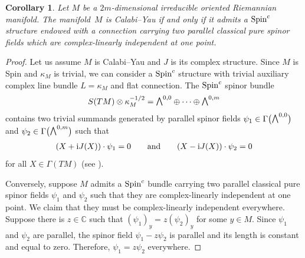 \documentclass[pdftex]{sigma}
\newcommand{\ext}{\raise1pt\hbox{\small$\bigwedge$}}
\numberwithin{equation}{section}
\newtheorem{Corollary}[Theorem]{Corollary}
\begin{document}
\begin{Corollary}Let $M$ be a $2m$-dimensional irreducible oriented Riemannian manifold. The mani\-fold~$M$ is Calabi--Yau if and only if it admits a ${\rm Spin}^c$ structure endowed with a connection carrying two parallel classical pure spinor fields which are complex-linearly independent at one point.
\end{Corollary}
\begin{proof} Let us assume $M$ is Calabi--Yau and $J$ is its complex structure. Since $M$ is Spin and $\kappa_M$ is trivial, we can consider a ${\rm Spin}^c$ structure with trivial auxiliary complex line bundle $L=\kappa_M$ and flat connection. The ${\rm Spin}^c$ spinor bundle
\begin{gather*}S(TM)\otimes \kappa_M^{-1/2} =
 \ext^{0,0}\oplus \cdots \oplus \ext^{0,m}
\end{gather*}
contains two trivial summands generated by parallel spinor fields $\psi_1\in\Gamma\big(\ext^{0,0}\big)$ and $\psi_2\in\Gamma\big(\ext^{0,m}\big)$ such that
\begin{gather*}(X+{\rm i} J(X))\cdot\psi_1=0 \qquad\text{and}\qquad (X-{\rm i} J(X))\cdot\psi_2=0\end{gather*}
for all $X\in \Gamma(TM)$ (see \cite{Friedrich}).

Conversely, suppose $M$ admits a ${\rm Spin}^c$ bundle carrying two parallel classical pure spinor fields $\psi_1$ and $\psi_2$ such that they are complex-linearly independent at one point. We claim that they must be complex-linearly independent everywhere. Suppose there is $z\in\mathbb{C}$ such that $(\psi_1)_y=z(\psi_2)_y$ for some $y\in M$. Since $\psi_1$ and $\psi_2$ are parallel, the spinor field $\psi_1-z\psi_2$ is parallel and its length is constant and equal to zero. Therefore, $\psi_1=z\psi_2$ everywhere.


\end{proof}
\end{document}
